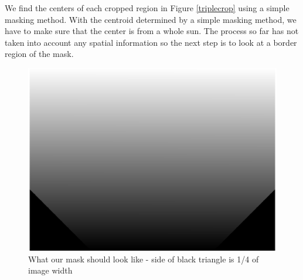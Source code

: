 \documentclass[10pt]{scrartcl}
\begin{document}
	We find the centers of each cropped region in Figure \ref{triplecrop} using a simple masking method. With the centroid determined by a simple masking method, we have to make sure that the center is from a whole sun. The process so far has not taken into account any spatial information so the next step is to look at a border region of the mask. 





\begin{figure}[!ht]
    \centering
    \includegraphics[width=.9\textwidth]{../plots_tables_images/cutcorner.eps}    
    \caption{What our mask should look like - side of black triangle is 1/4 of image width}
    \label{dogeared}
\end{figure}
\end{document}
